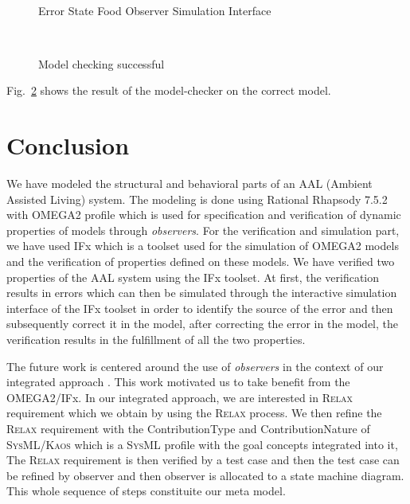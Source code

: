 \documentclass[a4paper,twoside]{article}
\def\myrelax{\textsc{Relax}}                  %
\def\sysml{\textsc{SysML}}
\def\kaos{\textsc{Kaos}}
\begin{document}
\begin{figure}[!h]
  \vspace{8cm}~
  \centering
  {}
  \caption{Error State Food Observer Simulation Interface}
  \label{fig:errorstatefoodobserver}
 \end{figure}

\begin{figure}[!h]
  \vspace{8cm}~
  \centering
  {}
  \caption{Model checking successful}
  \label{fig:verificationok}
 \end{figure} 

Fig.~\ref{fig:verificationok} shows the result of the model-checker on the correct model.

\section{{Conclusion}
\label{sec:conclusion}}
We have modeled the structural and behavioral parts of an AAL (Ambient Assisted Living) system. The modeling is done using Rational Rhapsody 7.5.2  with OMEGA2 profile which is used for specification and verification of dynamic properties of models through \textit{observers}. For the verification and simulation part, we have used IFx which is a toolset used for the simulation of OMEGA2 models and the verification of properties defined on these models. We have verified two properties of the AAL system using the IFx toolset. At first, the verification results in errors which can then be simulated through the interactive simulation interface of the IFx toolset in order to identify the source of the error and then subsequently correct it in the model, after correcting the error in the model, the verification results in the fulfillment of all the two properties. 

The future work is centered around the use of \textit{observers} in the context of our integrated approach \cite{test17}. This work motivated us to take benefit from the OMEGA2/IFx. In our integrated approach, we are interested in \myrelax{} requirement which we obtain by using the \myrelax{} process. We then refine the \myrelax{} requirement with the ContributionType and ContributionNature of \sysml{}/\kaos{} which is a \sysml{} profile with the goal concepts integrated into it,
The \myrelax{} requirement is then verified by a test case and then the test case can be refined by observer and then observer is allocated to a state machine diagram. This whole sequence of steps constituite our meta model.
\end{document}
